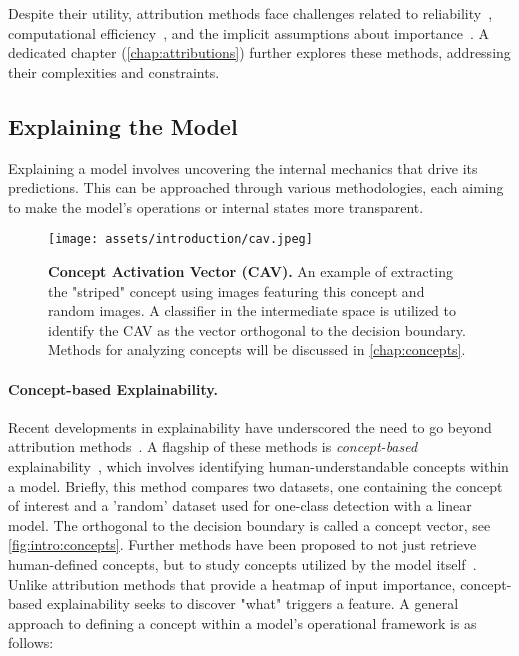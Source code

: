 Despite their utility, attribution methods face challenges related to reliability~\cite{adebayo2018sanity,sixt2020explanations,ghorbani2017interpretation,slack2021counterfactual,sturmfels2020visualizing,hsieh2020evaluations,hase2021out}, computational efficiency~\cite{novello2022making}, and the implicit assumptions about importance~\cite{eva2}. A dedicated chapter (\autoref{chap:attributions}) further explores these methods, addressing their complexities and constraints.

\subsection{Explaining the Model}

Explaining a model involves uncovering the internal mechanics that drive its predictions. This can be approached through various methodologies, each aiming to make the model's operations or internal states more transparent.

\begin{figure}[ht]
    \centering
    \texttt{[image: assets/introduction/cav.jpeg]}
    \caption{\textbf{Concept Activation Vector (CAV).} An example of extracting the "striped" concept using images featuring this concept and random images. A classifier in the intermediate space is utilized to identify the CAV as the vector orthogonal to the decision boundary. Methods for analyzing concepts will be discussed in \autoref{chap:concepts}.}
    \label{fig:intro:concepts}
\end{figure}

\paragraph{Concept-based Explainability.} Recent developments in explainability have underscored the need to go beyond attribution methods~\cite{doshivelez2017rigorous}. A flagship of these methods is \textit{concept-based} explainability~\cite{kim2018interpretability}, which involves identifying human-understandable concepts within a model. Briefly, this method compares two datasets, one containing the concept of interest and a 'random' dataset used for one-class detection with a linear model. The orthogonal to the decision boundary is called a concept vector, see \autoref{fig:intro:concepts}. Further methods have been proposed to not just retrieve human-defined concepts, but to study concepts utilized by the model itself~\cite{ghorbani2019towards,fel2023craft,lrpconcepts,graziani2023concept,zhang2021invertible,fel2023holistic}. Unlike attribution methods that provide a heatmap of input importance, concept-based explainability seeks to discover "what" triggers a feature. A general approach to defining a concept within a model's operational framework is as follows:

